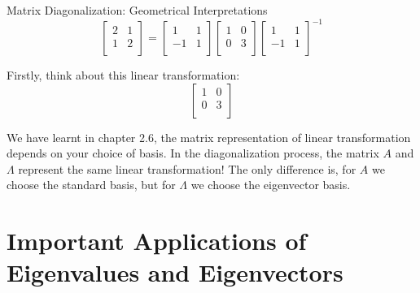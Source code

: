\documentclass{beamer}
\begin{document}
\begin{frame}{Matrix Diagonalization: Geometrical Interpretations}
    \begin{equation*}
        \left[ \begin{matrix}
            2&		1\\
            1&		2\\
        \end{matrix} \right] =\left[ \begin{matrix}
            1&		1\\
            -1&		1\\
        \end{matrix} \right] \left[ \begin{matrix}
            1&		0\\
            0&		3\\
        \end{matrix} \right] \left[ \begin{matrix}
            1&		1\\
            -1&		1\\
        \end{matrix} \right] ^{-1}
    \end{equation*}

Firstly, think about this linear transformation:
\begin{equation*}
    \left[ \begin{matrix}
        1&		0\\
        0&		3\\
    \end{matrix} \right]
\end{equation*}

We have learnt in chapter 2.6, the matrix representation of linear transformation depends on your choice of basis. In the diagonalization process, the matrix $A$ and $\varLambda$ represent the same linear transformation! The only difference is, for $A$ we choose the standard basis, but for $\varLambda$ we choose the eigenvector basis.
\end{frame}


\section{Important Applications of Eigenvalues and Eigenvectors}
\end{document}
